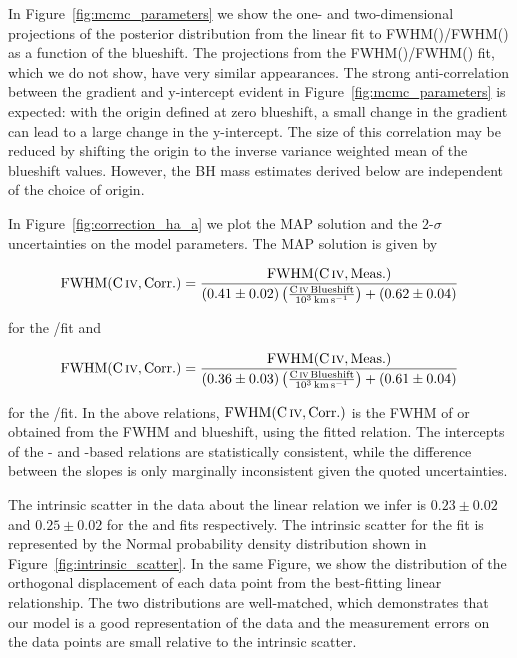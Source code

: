 In Figure~\ref{fig:mcmc_parameters} we show the one- and two-dimensional projections of the posterior distribution from the linear fit to FWHM()/FWHM(\hans) as a function of the  blueshift.
The projections from the FWHM()/FWHM(\hbns) fit, which we do not show, have very similar appearances.
The strong anti-correlation between the gradient and y-intercept evident in Figure~\ref{fig:mcmc_parameters} is expected: with the origin defined at zero blueshift, a small change in the gradient can lead to a large change in the y-intercept.
The size of this correlation may be reduced by shifting the origin to the inverse variance weighted mean of the blueshift values.
However, the BH mass estimates derived below are independent of the choice of origin.

In Figure~\ref{fig:correction_ha_a} we plot the MAP solution and the $2$-$\sigma$ uncertainties on the model parameters.
The MAP solution is given by

\begingroup\makeatletter{}\check@mathfonts
\begin{eqnarray}
    \label{eq:hafwhm}
    \text{FWHM}(\text{C}\,\textsc{iv}, \text{Corr.}) = \frac{\text{FWHM}(\text{C}\,\textsc{iv}, \text{Meas.})}{ (0.41\pm0.02) \left(\frac{\text{C}\,\textsc{iv}\, \text{Blueshift}}{10^3 \,\text{km}\,\text{s}^{-1}} \right) + (0.62\pm0.04)}
\end{eqnarray}
\endgroup

\noindent for the /\ha fit and

\begingroup\makeatletter{}\check@mathfonts
\begin{eqnarray}
    \label{eq:hbfwhm}
    \text{FWHM}(\text{C}\,\textsc{iv}, \text{Corr.}) = \frac{\text{FWHM}(\text{C}\,\textsc{iv}, \text{Meas.})}{ (0.36\pm0.03) \left(\frac{\text{C}\,\textsc{iv}\, \text{Blueshift}}{10^3 \,\text{km}\,\text{s}^{-1}} \right) + (0.61\pm0.04)}
\end{eqnarray}
\endgroup

\noindent for the /\hb fit.
In the above relations, $\text{FWHM}(\text{C}\,\textsc{iv}, \text{Corr.})$ is the FWHM of \ha or \hb obtained from the  FWHM and blueshift, using the fitted relation.
The intercepts of the \hans- and \hbns-based relations are statistically consistent, while the difference between the slopes is only marginally inconsistent given the quoted uncertainties.

The intrinsic scatter in the data about the linear relation we infer is $0.23 \pm 0.02$ and $0.25 \pm 0.02$ for the \ha and \hb fits respectively.
The intrinsic scatter for the \ha fit is represented by the Normal probability density distribution shown in Figure~\ref{fig:intrinsic_scatter}.
In the same Figure, we show the distribution of the orthogonal displacement of each data point from the best-fitting linear relationship.
The two distributions are well-matched, which demonstrates that our model is a good representation of the data and the measurement errors on the data points are small relative to the intrinsic scatter.

